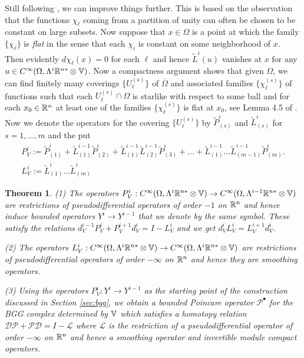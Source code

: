 \documentclass[11pt]{amsart}
\newtheorem{theorem}{Theorem}
\newcommand{\0}{\mathaccent23}
\newcommand{\bs}{{\scriptscriptstyle \bullet}}
\begin{document}
Still following \cite{costabel2010bogovskiui}, we can improve things further. This is based on the observation that the functions $\chi_\ell$ coming from a partition of unity can often be chosen to be constant on large subsets. Now suppose that $x\in\Omega$ is a point at which the family $\{\chi_\ell\}$ is \textit{flat} in the sense that each $\chi_i$ is constant on some neighborhood of $x$. Then evidently $d\chi_\ell (x)=0$ for each $\ell$ and hence $\tilde L^i(u)$ vanishes at $x$ for any $u\in  C^\infty(\Omega,\Lambda^i\Bbb R^{n*}\otimes\Bbb V)$. Now a compactness argument shows that given $\Omega$, we can find finitely many coverings $\{U^{(s)}_\ell\}$ of $\overline{\Omega}$ and associated families $\{\chi_\ell^{(s)}\}$ of functions such that each $U^{(s)}_\ell\cap\Omega$ is starlike with respect to some ball and for each $x_0\in\Bbb R^n$ at least one of the families $\{\chi_\ell^{(s)}\}$ is flat at $x_0$, see Lemma 4.5 of \cite{costabel2010bogovskiui}. Now we denote the operators for the covering $\{U^{(s)}_\ell\}$ by $\tilde P^i_{(s)}$ and $\tilde L^i_{(s)}$ for $s=1,\dots, m$ and the put
  \begin{gather}\label{P-Lip-def}
    P^i_V:=\tilde P^i_{(1)}+\tilde L^{i-1}_{(1)}\tilde P^i_{(2)}+\tilde L^{i-1}_{(1)}\tilde L^{i-1}_{(2)}\tilde P^i_{(3)}+\dots +\tilde L^{i-1}_{(1)}\dots \tilde L^{i-1}_{(m-1)}\tilde P^i_{(m)}.\\
    \label{K-Lip-def}    L^i_V:=\tilde L^i_{(1)}\dots\tilde L^i_{(m)}
  \end{gather}
  \begin{theorem}\label{thm:Lip-domains}
 (1) The operators $P^i_V:C^\infty(\Omega,\Lambda^i\Bbb R^{n*}\otimes\Bbb V)\to C^\infty(\Omega,\Lambda^{i-1}\Bbb R^{n*}\otimes\Bbb V)$ are restrictions of pseudodifferential operators of order $-1$ on $\Bbb R^n$ and  hence induce bounded operators $Y^i\to Y^{i-1}$ that we denote by the same symbol. These satisfy the relations $d^{i-1}_VP^i_V+P^{i+1}_Vd^i_V=I-L^i_V$ and we get $d^i_VL^i_V=L^{i+1}_Vd_V^i$.

(2)  The operators $L^i_V:C^\infty(\Omega,\Lambda^i\Bbb R^{n*}\otimes\Bbb V)\to C^\infty(\Omega,\Lambda^i\Bbb R^{n*}\otimes\Bbb V)$ are restrictions of pseudodifferential operators of order $-\infty$ on $\Bbb R^n$ and hence they are smoothing operators.

(3) Using the operators $P^i_V:Y^i\to Y^{i-1}$ as the starting point of the construction discussed in Section \ref{sec:bgg}, we obtain a bounded Poincare operator $\mathscr{P}^\bs$ for the BGG complex determined by $\Bbb V$ which satisfies a homotopy relation $\mathscr{D}\mathscr{P}+\mathscr{P}\mathscr{D}=I-\mathscr{L}$ where $\mathscr{L}$ is the restriction of a pseudodifferential operator of order $-\infty$ on $\Bbb R^n$ and hence a smoothing operator and invertible module compact operators. 
  \end{theorem}
\end{document}
